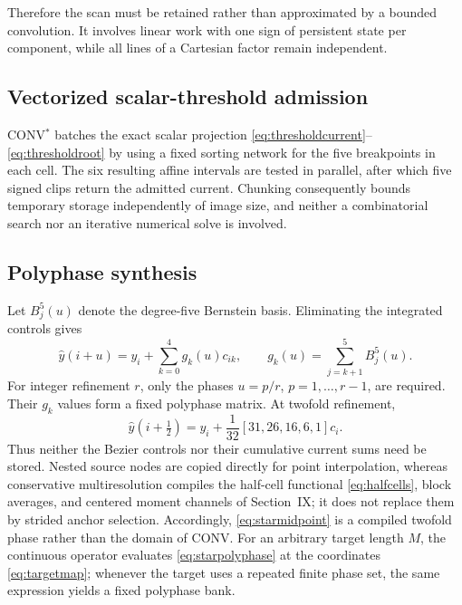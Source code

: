 \documentclass[journal]{IEEEtran}
\begin{document}
Therefore the scan must be retained rather than approximated by a bounded
convolution. It involves linear work with one sign of persistent state per
component, while all lines of a Cartesian factor remain independent.

\subsection{Vectorized scalar-threshold admission}

CONV$^{*}$ batches the exact scalar projection
\eqref{eq:thresholdcurrent}--\eqref{eq:thresholdroot} by using a fixed sorting
network for the five breakpoints in each cell. The six resulting affine
intervals are tested in parallel, after which five signed clips return the
admitted current. Chunking consequently bounds temporary storage
independently of image size, and neither a combinatorial search nor an
iterative numerical solve is involved.

\subsection{Polyphase synthesis}

Let \(B_j^5(u)\) denote the degree-five Bernstein basis. Eliminating the
integrated controls gives
\begin{equation}
 \widehat y(i+u)=y_i+\sum_{k=0}^{4}g_k(u)c_{ik},\qquad
 g_k(u)=\sum_{j=k+1}^{5}B_j^5(u).
 \label{eq:starpolyphase}
\end{equation}
For integer refinement \(r\), only the phases \(u=p/r\),
\(p=1,\ldots,r-1\), are required. Their \(g_k\) values form a fixed
polyphase matrix. At twofold refinement,
\begin{equation}
 \widehat y(i+\tfrac12)=y_i+\frac{1}{32}
 [31,26,16,6,1]c_i.
 \label{eq:starmidpoint}
\end{equation}
Thus neither the Bezier controls nor their cumulative current sums need be
stored. Nested source nodes are copied directly for point interpolation,
whereas conservative multiresolution compiles the half-cell functional
\eqref{eq:halfcells}, block averages, and centered moment channels of
Section~IX; it does not replace them by strided anchor selection.
Accordingly, \eqref{eq:starmidpoint} is a compiled twofold phase rather than
the domain of CONV. For an arbitrary target length \(M\), the continuous
operator evaluates \eqref{eq:starpolyphase} at the coordinates
\eqref{eq:targetmap}; whenever the target uses a repeated finite phase set,
the same expression yields a fixed polyphase bank.
\end{document}
